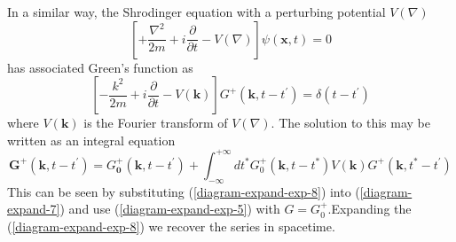 In a similar way, the Shrodinger equation with a perturbing potential $V(\nabla)$
\begin{equation}\left[+\frac{\nabla^{2}}{2 m}+i \frac{\partial}{\partial t}-V(\nabla)\right] \psi(\mathbf{x}, t)=0\end{equation}
has associated Green's function as
\begin{equation}\left[-\frac{k^{2}}{2 m}+i \frac{\partial}{\partial t}-V(\mathbf{k})\right] G^{+}\left(\mathbf{k}, t-t^{\prime}\right)=\delta\left(t-t^{\prime}\right)
\label{diagram-expand-7}
\end{equation}
where $V(\mathbf{k})$ is the Fourier transform of $V(\nabla) .$ The solution to this may be written as an integral equation
\begin{equation}\boldsymbol{G}^{+}\left(\mathbf{k}, t-t^{\prime}\right)=G_{\mathbf{0}}^{+}\left(\mathbf{k}, t-t^{\prime}\right)+\int_{-\infty}^{+\infty} d t^{*} G_{0}^{+}\left(\mathbf{k}, t-t^{*}\right) V(\mathbf{k}) G^{+}\left(\mathbf{k}, t^{*}-t^{\prime}\right)
\label{diagram-expand-exp-8}
\end{equation}
This can be seen by substituting (\ref{diagram-expand-exp-8}) into (\ref{diagram-expand-7}) and use (\ref{diagram-expand-exp-5}) with $G=G^+_0$.Expanding the (\ref{diagram-expand-exp-8}) we recover the series in spacetime.

